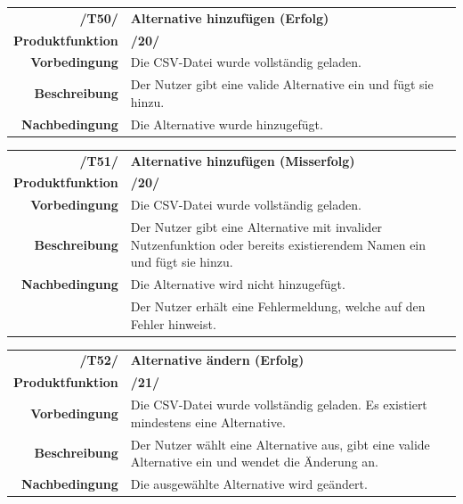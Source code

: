 \documentclass{article}
\begin{document}
\begin{table}[H]
\begin{tabularx}{\textwidth}{rX}
 \vspace{1mm}
\textbf{/T50/}         & \textbf{Alternative hinzufügen (Erfolg)} \\ \vspace{1mm}
\textbf{Produktfunktion} & \textbf{/20/} \\ \vspace{1mm}
\textbf{Vorbedingung}  & Die CSV-Datei wurde vollständig geladen.   \\ \vspace{1mm}
\textbf{Beschreibung}  & Der Nutzer gibt eine valide Alternative ein und fügt sie hinzu. \\
\textbf{Nachbedingung} & Die Alternative wurde hinzugefügt.
\end{tabularx}
\end{table}

\begin{table}[H]
\begin{tabularx}{\textwidth}{rX}
 \vspace{1mm}
\textbf{/T51/}         & \textbf{Alternative hinzufügen (Misserfolg)} \\ \vspace{1mm}
\textbf{Produktfunktion} & \textbf{/20/} \\ \vspace{1mm}
\textbf{Vorbedingung}  & Die CSV-Datei wurde vollständig geladen.   \\ \vspace{1mm}
\textbf{Beschreibung}  & Der Nutzer gibt eine Alternative mit invalider Nutzenfunktion oder bereits existierendem Namen ein und fügt sie hinzu. \\
\textbf{Nachbedingung} & Die Alternative wird nicht hinzugefügt. \\ & Der Nutzer erhält eine Fehlermeldung, welche auf den Fehler hinweist.
\end{tabularx}
\end{table}

\begin{table}[H]
\begin{tabularx}{\textwidth}{rX}
 \vspace{1mm}
\textbf{/T52/}         & \textbf{Alternative ändern (Erfolg)} \\ \vspace{1mm}
\textbf{Produktfunktion} & \textbf{/21/} \\ \vspace{1mm}
\textbf{Vorbedingung}  & Die CSV-Datei wurde vollständig geladen. Es existiert mindestens eine Alternative.  \\ \vspace{1mm}
\textbf{Beschreibung}  & Der Nutzer wählt eine Alternative aus, gibt eine valide Alternative ein und wendet die Änderung an. \\
\textbf{Nachbedingung} & Die ausgewählte Alternative wird geändert.
\end{tabularx}
\end{table}
\end{document}
